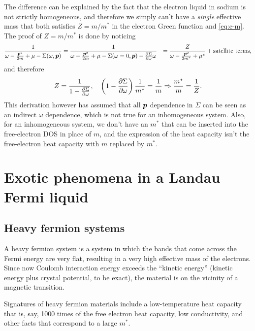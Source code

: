 \documentclass[hyperref, a4paper]{article}
\def\\{}%
\begin{document}
The difference can be explained by the fact 
that the electron liquid in sodium is not strictly homogeneous, 
and therefore we simply can't have a \emph{single} effective mass 
that both satisfies $Z = m / m^*$ in the electron Green function
and \eqref{eq:c-m}.
The proof of $Z = m / m^*$ is done by noticing 
\begin{equation}
    \begin{aligned}
        \frac{1}{\omega - \frac{\vb*{p}^2}{2m} + \mu - \Sigma(\omega, \vb*{p})}
        &= \frac{1}{\omega - \frac{\vb*{p}^2}{2m} + \mu - \Sigma(\omega = 0, \vb*{p}) - \pdv{\Sigma}{\omega} \omega} \\ 
        &= \frac{Z}{\omega - \frac{\vb*{p}^2}{2 m^*} + \mu^*} + \text{satellite terms},
    \end{aligned}
\end{equation}
and therefore 
\begin{equation}
    Z = \frac{1}{1 - \pdv{\Sigma}{\omega}} , 
    \quad \left(1 - \pdv{\Sigma}{\omega} \right) \frac{1}{m^*} = \frac{1}{m} 
    \Rightarrow \frac{m^*}{m} = \frac{1}{Z} .
\end{equation}
This derivation however has assumed that all $\vb*{p}$ dependence in $\Sigma$ 
can be seen as an indirect $\omega$ dependence, 
which is not true for an inhomogeneous system.
Also, for an inhomogeneous system,
we don't have an $m^*$ that can be inserted into 
the free-electron DOS in place of $m$,
and the expression of the heat capacity 
isn't the free-electron heat capacity with $m$ replaced by $m^*$.

\section{Exotic phenomena in a Landau Fermi liquid}

\subsection{Heavy fermion systems}

A heavy fermion system is a system in which 
the bands that come across the Fermi energy
are very flat, 
resulting in a very high effective mass of the electrons.
Since now Coulomb interaction energy exceeds 
the ``kinetic energy''
(kinetic energy plus crystal potential, to be exact),
the material is on the vicinity of a magnetic transition.

Signatures of heavy fermion materials include 
a low-temperature heat capacity that is, say, 1000 times 
of the free electron heat capacity,
low conductivity, 
and other facts that correspond to a large $m^*$.
\end{document}
